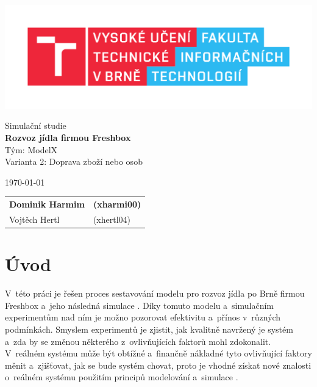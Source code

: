 \documentclass[a4paper, 11pt]{article}
\begin{document}
	\begin{titlepage}
		\begin{center}
			\includegraphics[width=0.77 \linewidth]{inc/FIT_logo.pdf}


			\Huge{Simulační studie} \\
			\LARGE{\textbf{Rozvoz jídla firmou Freshbox}} \\
			\Large{Tým: ModelX} \\
			\Large{Varianta 2: Doprava zboží nebo osob}

		\end{center}

		\begin{minipage}{0.5 \textwidth}
			\Large
			\today
		\end{minipage}
		\hfill
		\begin{minipage}[r]{0.5 \textwidth}
			\Large
			\begin{tabular}{ll}
				\textbf{Dominik Harmim} & \textbf{(xharmi00)} \\
				Vojtěch Hertl & (xhertl04)
			\end{tabular}
		\end{minipage}
	\end{titlepage}



	\clearpage
	\setcounter{page}{1}
	\tableofcontents



	\clearpage
	\setcounter{page}{1}

	\section{Úvod}

	V~této práci je řešen proces sestavování modelu \cite[snímek 7]{IMS_slides}
	pro rozvoz jídla po Brně firmou Freshbox \cite{Freshbox} a~jeho následná
	simulace \cite[snímek 33]{IMS_slides}. Díky tomuto modelu a~simulačním
	experimentům \cite[snímek 9]{IMS_slides} nad ním je možno pozorovat
	efektivitu a~přínos v~různých podmínkách. Smyslem experimentů je zjistit,
	jak kvalitně navržený je systém \cite[snímek 18]{IMS_slides} a~zda by se
	změnou některého z~ovlivňujících faktorů mohl zdokonalit. V~reálném
	systému může být obtížné a~finančně nákladné tyto ovlivňující faktory
	měnit a~zjišťovat, jak se bude systém chovat, proto je vhodné získat
	nové znalosti o~reálném systému použitím principů modelování
	a~simulace \cite[snímek 9]{IMS_slides}.
\end{document}
